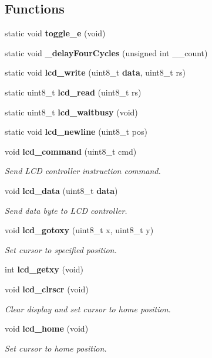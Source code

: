 \subsection*{Functions}
\begin{CompactItemize}
\item 
static void {\bf toggle\_\-e} (void)
\item 
static void {\bf \_\-delayFourCycles} (unsigned int \_\-\_\-count)
\item 
static void {\bf lcd\_\-write} (uint8\_\-t {\bf data}, uint8\_\-t rs)
\item 
static uint8\_\-t {\bf lcd\_\-read} (uint8\_\-t rs)
\item 
static uint8\_\-t {\bf lcd\_\-waitbusy} (void)
\item 
static void {\bf lcd\_\-newline} (uint8\_\-t pos)
\item 
void {\bf lcd\_\-command} (uint8\_\-t cmd)
\begin{CompactList}\small\item\em Send LCD controller instruction command. \item\end{CompactList}\item 
void {\bf lcd\_\-data} (uint8\_\-t {\bf data})
\begin{CompactList}\small\item\em Send data byte to LCD controller. \item\end{CompactList}\item 
void {\bf lcd\_\-gotoxy} (uint8\_\-t x, uint8\_\-t y)
\begin{CompactList}\small\item\em Set cursor to specified position. \item\end{CompactList}\item 
int {\bf lcd\_\-getxy} (void)
\item 
void {\bf lcd\_\-clrscr} (void)
\begin{CompactList}\small\item\em Clear display and set cursor to home position. \item\end{CompactList}\item 
void {\bf lcd\_\-home} (void)
\begin{CompactList}\small\item\em Set cursor to home position. \item\end{CompactList}\item 

\end{CompactItemize}
